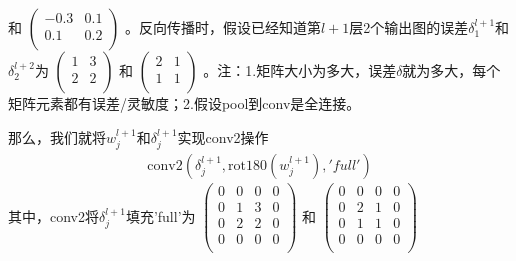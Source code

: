             和
            \begin{math}
            \left(
            \begin{smallmatrix}
            -0.3 & 0.1 \\
            0.1 & 0.2\\
            \end{smallmatrix}
            \right)
            \end{math}
            。反向传播时，假设已经知道第$l+1$层2个输出图的误差$\delta_1^{l+1}$和$\delta_2^{l+2}$为
            \begin{math}
            \left(
            \begin{smallmatrix}
            1& 3 \\
            2& 2\\
            \end{smallmatrix}
            \right)
            \end{math}
            和
            \begin{math}
            \left(
            \begin{smallmatrix}
            2& 1 \\
            1& 1\\
            \end{smallmatrix}
            \right)
            \end{math}
            。注：1.矩阵大小为多大，误差$\delta$就为多大，每个矩阵元素都有误差/灵敏度；2.假设pool到conv是全连接。
            \par
            那么，我们就将$w_j^{l+1}$和$\delta_j^{l+1}$实现conv2操作
            \begin{align*}
            \mathrm{conv2}(\delta_j^{l+1},\mathrm{rot180}(w_j^{l+1}),'full')
            \end{align*}
            其中，conv2将$\delta_j^{l+1}$填充'full'为
            \begin{math}
            \left(
            \begin{smallmatrix}
            0 & 0 & 0 & 0\\
            0 & 1 & 3 & 0\\
            0 & 2 & 2 & 0\\
            0 & 0 & 0 & 0\\
            \end{smallmatrix}
            \right)
            \end{math}
            和
            \begin{math}
            \left(
            \begin{smallmatrix}
            0 & 0 & 0 & 0\\
            0 & 2 & 1 & 0\\
            0 & 1 & 1 & 0\\
            0 & 0 & 0 & 0\\
            \end{smallmatrix}
            \right)
            \end{math}
